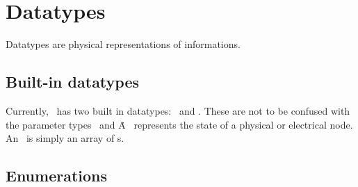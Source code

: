 
\chapter{Datatypes}
\label{sec:datatypes}

Datatypes are physical representations of informations.  


\section{Built-in datatypes}
\label{sec:datatypes:builtin}

Currently, \artxx\ has two built in datatypes: \bool\ and \int.  
These are not to be confused with the parameter types \pbool\ and \pint\.  
A \bool\ represents the state of a physical or electrical node.  
An \int\ is simply an array of \bool s.  

\section{Enumerations}
\label{sec:datatype:enum}


